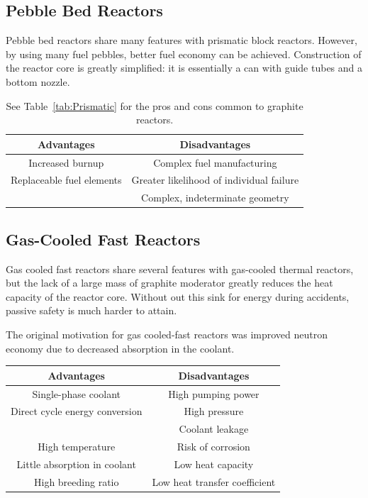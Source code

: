 \subsection{Pebble Bed Reactors}
Pebble bed reactors share many features with prismatic block reactors. However, by using many fuel pebbles, better fuel economy can be achieved. %
Construction of the reactor core is greatly simplified: it is essentially a can with guide tubes and a bottom nozzle. 
\begin{table}[!h]
\begin{tabular}{c|c}
  Advantages & Disadvantages \\
  \hline
  Increased burnup & Complex fuel manufacturing\\
  Replaceable fuel elements & Greater likelihood of individual failure\\
   & Complex, indeterminate geometry\\
\end{tabular}
\caption{See Table~\ref{tab:Prismatic} for the pros and cons common to graphite reactors.}
\end{table}

\subsection{Gas-Cooled Fast Reactors}
Gas cooled fast reactors share several features with gas-cooled thermal reactors, but the lack of a large mass of graphite moderator greatly reduces the heat capacity of the reactor core. Without out this sink for energy during accidents, passive safety is much harder to attain.

The original motivation for gas cooled-fast reactors was improved neutron economy due to decreased absorption in the coolant. 
\begin{table}[!h]
\begin{tabular}{c|c}
  Advantages & Disadvantages \\
  \hline
  Single-phase coolant & High pumping power \\
  Direct cycle energy conversion & High pressure\\
   & Coolant leakage \\
  High temperature & Risk of corrosion \\
  Little absorption in coolant & Low heat capacity\\
  High breeding ratio & Low heat transfer coefficient\\
\end{tabular}
\end{table}


